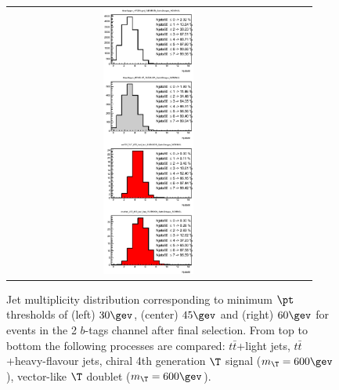 \begin{figure}[htbp]
\begin{center}
\begin{tabular}{ccc}
\includegraphics[width=0.33\textwidth]{appendices/figures/htx_httail/blinding_on_Njets60__ELEMUON_6jetin2btagex_NOMINAL.eps} \\
\end{tabular}\caption{\small {Jet multiplicity distribution corresponding to minimum $\pt$ thresholds of (left) $30\gev$, (center) $45\gev$ and (right) $60\gev$ for events in the 2 $b$-tags channel after final selection. From top to bottom the following processes are compared: $t\bar{t}$+light jets, $t\bar{t}$+heavy-flavour jets, chiral 4th generation $\T$ signal ($m_{\T}=600\gev$), vector-like $\T$ doublet ($m_{\T}=600\gev$). }}
\label{fig:blinding_on_Njets_6jetin2btagex}
\end{center}
\end{figure}
